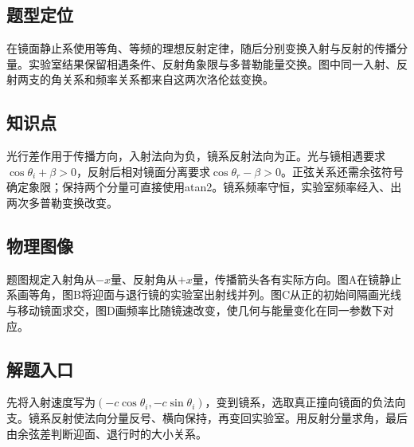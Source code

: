 \documentclass[UTF8,fontset=fandol,a4paper,11pt]{ctexart}
\begin{document}


\subsection*{题型定位}

在镜面静止系使用等角、等频的理想反射定律，随后分别变换入射与反射的传播分量。实验室结果保留相遇条件、反射角象限与多普勒能量交换。图中同一入射、反射两支的角关系和频率关系都来自这两次洛伦兹变换。



\subsection*{知识点}

光行差作用于传播方向，入射法向为负，镜系反射法向为正。光与镜相遇要求$\cos\theta_i+\beta>0$，反射后相对镜面分离要求$\cos\theta_r-\beta>0$。正弦关系还需余弦符号确定象限；保持两个分量可直接使用atan2。镜系频率守恒，实验室频率经入、出两次多普勒变换改变。



\subsection*{物理图像}

题图规定入射角从$-x$量、反射角从$+x$量，传播箭头各有实际方向。图A在镜静止系画等角，图B将迎面与退行镜的实验室出射线并列。图C从正的初始间隔画光线与移动镜面求交，图D画频率比随镜速改变，使几何与能量变化在同一参数下对应。



\subsection*{解题入口}

先将入射速度写为$(-c\cos\theta_i,-c\sin\theta_i)$，变到镜系，选取真正撞向镜面的负法向支。镜系反射使法向分量反号、横向保持，再变回实验室。用反射分量求角，最后由余弦差判断迎面、退行时的大小关系。


\end{document}

